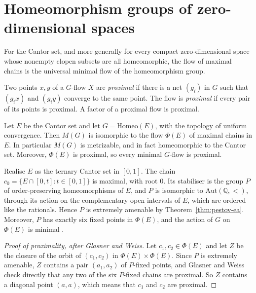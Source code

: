\section{Homeomorphism groups of zero-dimensional spaces}\label{sec:zero-dim}

For the Cantor set, and more generally for every compact zero-dimensional
space whose nonempty clopen subsets are all homeomorphic, the flow of maximal
chains is the universal minimal flow of the homeomorphism group.

\begin{definition}\label{def:proximal}
Two points $x,y$ of a $G$-flow $X$ are \emph{proximal} if there is a net
$(g_i)$ in $G$ such that $(g_ix)$ and $(g_iy)$ converge to the same point. The
flow is \emph{proximal} if every pair of its points is proximal. A factor of
a proximal flow is proximal.
\end{definition}

\begin{theorem}\label{thm:gw-cantor}
Let $E$ be the Cantor set and let $G=\mathrm{Homeo}(E)$, with the topology of
uniform convergence. Then $M(G)$ is isomorphic to the flow $\Phi(E)$ of
maximal chains in $E$. In particular $M(G)$ is metrizable, and in fact
homeomorphic to the Cantor set. Moreover, $\Phi(E)$ is proximal, so every
minimal $G$-flow is proximal.
\end{theorem}

\begin{example}\label{ex:standard-chain}
Realise $E$ as the ternary Cantor set in $[0,1]$. The chain
$c_0=\{E\cap[0,t] : t\in[0,1]\}$ is maximal, with root $0$. Its stabiliser is
the group $P$ of order-preserving homeomorphisms of $E$, and $P$ is isomorphic
to $\mathrm{Aut}(\mathbb{Q},<)$, through its action on the complementary open
intervals of $E$, which are ordered like the rationals. Hence $P$ is extremely
amenable by Theorem~\ref{thm:pestov-ea}. Moreover, $P$ has exactly six fixed
points in $\Phi(E)$, and the action of $G$ on $\Phi(E)$ is minimal
\cite[Theorems~1.2 and~1.3]{GlasnerWeiss2003}.
\end{example}

\begin{proof}[Proof of proximality, after Glasner and Weiss]
Let $c_1,c_2\in\Phi(E)$ and let $Z$ be the closure of the orbit of
$(c_1,c_2)$ in $\Phi(E)\times\Phi(E)$. Since $P$ is extremely amenable, $Z$
contains a pair $(a_1,a_2)$ of $P$-fixed points, and Glasner and Weiss check
directly that any two of the six $P$-fixed chains are proximal. So $Z$
contains a diagonal point $(a,a)$, which means that $c_1$ and $c_2$ are
proximal.
\end{proof}

